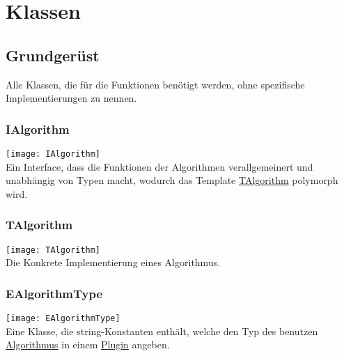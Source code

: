 \section{Klassen}
\graphicspath{{./img/workflow/}}
\subsection{Grundgerüst}
Alle Klassen, die für die Funktionen benötigt werden, ohne spezifische Implementierungen zu nennen.
\subsubsection{IAlgorithm}\label{Workflow:IAlgorithm}
\texttt{[image: IAlgorithm]}\\
Ein Interface, dass die Funktionen der Algorithmen verallgemeinert und unabhängig von Typen macht, wodurch das Template \hyperref[Workflow:TAlgorithm]{TAlgorithm} polymorph wird.
\beginMembers
{}
\closeMembers

\subsubsection{TAlgorithm}\label{Workflow:TAlgorithm}
\texttt{[image: TAlgorithm]}\\
Die Konkrete Implementierung eines Algorithmus.
\beginMembers
{}
\closeMembers

\subsubsection{EAlgorithmType}
\texttt{[image: EAlgorithmType]}\\
Eine Klasse, die string-Konstanten enthält, welche den Typ des benutzen \hyperref[Workflow:IAlgorithm]{Algorithmus} in einem \hyperref[Workflow:APlugin]{Plugin} angeben.
\beginAttributes
{}
\closeMembers


